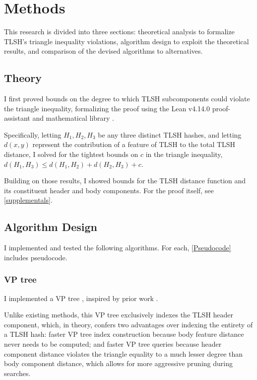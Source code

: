\documentclass[5p,final]{elsarticle}
\begin{document}
\section{Methods}\label{Methods}

This research is divided into three sections: theoretical
analysis to formalize TLSH's triangle inequality violations,
algorithm design to exploit the theoretical results, and comparison
of the devised algorithms to alternatives.

\subsection{Theory}

I first proved bounds on the degree to which TLSH subcomponents
could violate the triangle inequality, formalizing the proof using
the Lean v4.14.0 \cite{deMouraUllrich2021} proof-assistant and
mathematical library \cite{Mathlib}.

Specifically, letting $H_1, H_2, H_3$ be any three distinct TLSH
hashes, and letting $d(x, y)$ represent the contribution of a feature
of TLSH to the total TLSH distance, I solved for the tightest bounds
on $c$ in the triangle inequality, $d(H_1, H_3) \leq d(H_1, H_2) +
d(H_2, H_3) + c$.

Building on those results, I showed bounds for the TLSH distance
function and its constituent header and body components. For the
proof itself, see \ref{supplementals}.

\subsection{Algorithm Design}

I implemented and tested the following algorithms. For each,
\ref{Pseudocode} includes pseudocode.

\subsubsection{VP tree}

I implemented a VP tree
\cite{yianilosDataStructuresAlgorithms1993,uhlmannSatisfyingGeneralProximity1991},
inspired by prior work \cite{oliverHACTFastSearch2020}.

Unlike existing methods, this VP tree exclusively indexes the TLSH header
component, which, in theory, confers two advantages over indexing the
entirety of a TLSH hash: faster VP tree index construction because
body feature distance never needs to be computed; and faster VP tree
queries because header component distance violates the triangle
equality to a much lesser degree than body component distance, which
allows for more aggressive pruning during searches.
\end{document}
